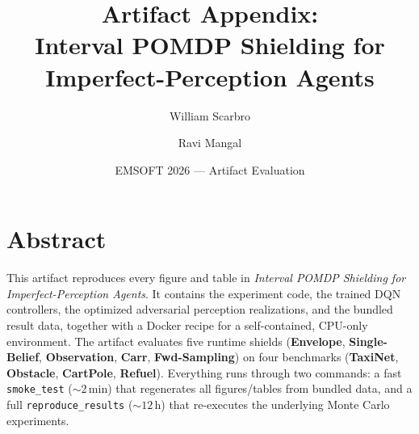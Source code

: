 \documentclass[10pt]{article}
\title{\vspace{-2.5em}\textbf{Artifact Appendix:\\ Interval POMDP Shielding for Imperfect-Perception Agents}}
\author{William Scarbro \and Ravi Mangal}
\date{EMSOFT 2026 --- Artifact Evaluation}
\newcommand{\code}[1]{\texttt{#1}}
\begin{document}
\maketitle
\vspace{-1.5em}

\section*{Abstract}
This artifact reproduces every figure and table in \emph{Interval POMDP Shielding
for Imperfect-Perception Agents}. It contains the experiment code, the trained
DQN controllers, the optimized adversarial perception realizations, and the
bundled result data, together with a Docker recipe for a self-contained,
CPU-only environment. The artifact evaluates five runtime shields
(\textbf{Envelope}, \textbf{Single-Belief}, \textbf{Observation}, \textbf{Carr},
\textbf{Fwd-Sampling}) on four benchmarks (\textbf{TaxiNet}, \textbf{Obstacle},
\textbf{CartPole}, \textbf{Refuel}). Everything runs through two commands:
a fast \code{smoke\_test} (${\sim}2$\,min) that regenerates all figures/tables
from bundled data, and a full \code{reproduce\_results} (${\sim}12$\,h) that
re-executes the underlying Monte Carlo experiments.
\end{document}
